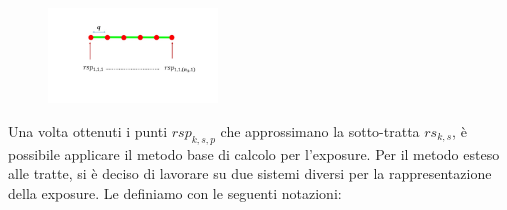 	\begin{figure}[h]
	\centering
	\includegraphics[width=0.4\textwidth]{images/routes3}
	\caption{}
	\label{img:campionamento}
	\end{figure}

\noindent Una volta ottenuti i punti $rsp_{k,s,p}$ che approssimano la sotto-tratta $rs_{k,s}$, è possibile applicare il metodo base di calcolo per l'exposure. Per il metodo esteso alle tratte, si è deciso di lavorare su due sistemi diversi per la rappresentazione della exposure. Le definiamo con le seguenti notazioni:

